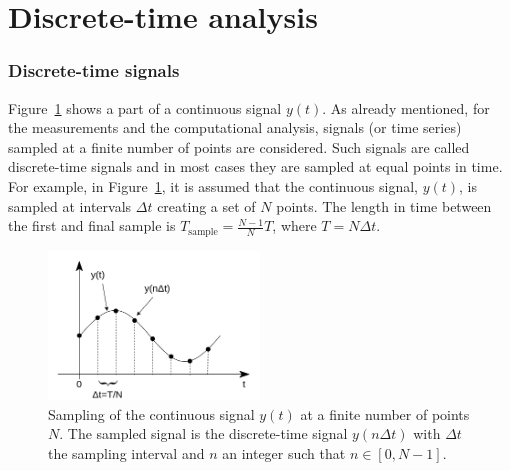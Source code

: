 \section{Discrete-time analysis}\label{app:discrete_time_analysis}

\subsubsection*{Discrete-time signals} %
Figure~\ref{fig:sampling_of_continuous_signal} shows a part of a continuous signal $y(t)$. As already mentioned, for the measurements and the computational analysis, signals (or time series) sampled at a finite number of points are considered. Such signals are called discrete-time signals and in most cases they are sampled at equal points in time. For example, in Figure~\ref{fig:sampling_of_continuous_signal}, it is assumed that the continuous signal, $y(t)$, is sampled at intervals $\Delta t$ creating a set of $N$ points. The length in time between the first and final sample is $T_\mathrm{sample}=\frac{N-1}{N}T$, where $T = N\Delta t$. %


\begin{figure}[!ht]
     \centering         
     \includegraphics[width=0.5\textwidth]{./images/app_B/approximation_of_signal_by_sampling_v2.png}
         \caption{Sampling of the continuous signal $y(t)$ at a finite number of points $N$. The sampled signal is the discrete-time signal $y(n\Delta t)$ with $\Delta t$ the sampling interval and  $n$ an integer such that $n \in \left[0,N-1 \right ]$.}
         \label{fig:sampling_of_continuous_signal}
\end{figure}

